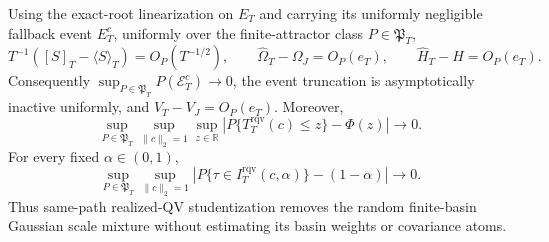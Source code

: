 Using the exact-root linearization on \(E_T\) and carrying its uniformly negligible fallback event \(E_T^c\), uniformly over the finite-attractor class \(P\in\mathfrak P_T\),
\[
 T^{-1}([S]_T-\langle S\rangle_T)=O_P(T^{-1/2}),\qquad
 \widehat\Omega_T-\Omega_J=O_P(e_T),\qquad
 \widehat H_T-H=O_P(e_T).
\]
Consequently \(\sup_{P\in\mathfrak P_T}P(\mathcal E_T^c)\to0\), the event truncation is asymptotically inactive uniformly, and \(\widehat V_T-V_J=O_P(e_T)\). Moreover,
\[
 \sup_{P\in\mathfrak P_T}\sup_{\|c\|_2=1}\sup_{z\in\mathbb R}
 \left|P\{T_T^{\mathrm{rqv}}(c)\le z\}-\Phi(z)\right|\longrightarrow0.
\]
For every fixed \(\alpha\in(0,1)\),
\[
 \sup_{P\in\mathfrak P_T}\sup_{\|c\|_2=1}
 \left|P\{\tau\in I_T^{\mathrm{rqv}}(c,\alpha)\}-(1-\alpha)\right|\longrightarrow0.
\]
Thus same-path realized-QV studentization removes the random finite-basin Gaussian scale mixture without estimating its basin weights or covariance atoms.